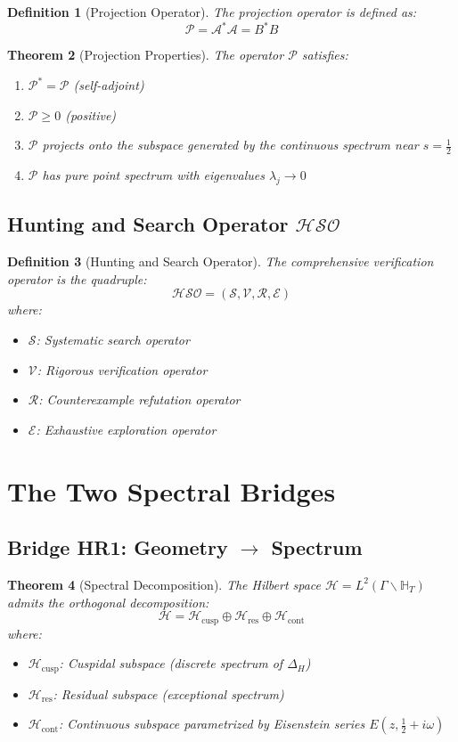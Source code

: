 \documentclass[11pt]{article}
\theoremstyle{plain}
\newtheorem{theorem}{Theorem}[section]
\newtheorem{definition}[theorem]{Definition}
\theoremstyle{remark}
\newcommand{\H}{\mathbb{H}}
\newcommand{\cH}{\mathcal{H}}
\newcommand{\cA}{\mathcal{A}}
\newcommand{\cP}{\mathcal{P}}
\newcommand{\cS}{\mathcal{S}}
\newcommand{\cV}{\mathcal{V}}
\newcommand{\cR}{\mathcal{R}}
\newcommand{\cE}{\mathcal{E}}
\newcommand{\HSO}{\mathcal{HSO}}
\newcommand{\Laplace}{\Delta}
\begin{document}
\begin{definition}[Projection Operator]
The projection operator is defined as:
\[
\cP = \cA^* \cA = B^*B
\]
\end{definition}

\begin{theorem}[Projection Properties]
The operator $\cP$ satisfies:
\begin{enumerate}
\item $\cP^* = \cP$ (self-adjoint)
\item $\cP \geq 0$ (positive)
\item $\cP$ projects onto the subspace generated by the continuous spectrum near $s = \tfrac{1}{2}$
\item $\cP$ has pure point spectrum with eigenvalues $\lambda_j \to 0$
\end{enumerate}
\end{theorem}

\subsection{Hunting and Search Operator $\HSO$}

\begin{definition}[Hunting and Search Operator]
The comprehensive verification operator is the quadruple:
\[
\HSO = (\cS, \cV, \cR, \cE)
\]
where:
\begin{itemize}
\item $\cS$: Systematic search operator
\item $\cV$: Rigorous verification operator  
\item $\cR$: Counterexample refutation operator
\item $\cE$: Exhaustive exploration operator
\end{itemize}
\end{definition}

\section{The Two Spectral Bridges}

\subsection{Bridge HR1: Geometry $\rightarrow$ Spectrum}

\begin{theorem}[Spectral Decomposition]
The Hilbert space $\cH = L^2(\Gamma \backslash \H_T)$ admits the orthogonal decomposition:
\[
\cH = \cH_{\text{cusp}} \oplus \cH_{\text{res}} \oplus \cH_{\text{cont}}
\]
where:
\begin{itemize}
\item $\cH_{\text{cusp}}$: Cuspidal subspace (discrete spectrum of $\Laplace_H$)
\item $\cH_{\text{res}}$: Residual subspace (exceptional spectrum)  
\item $\cH_{\text{cont}}$: Continuous subspace parametrized by Eisenstein series $E(z, \tfrac{1}{2} + i\omega)$
\end{itemize}
\end{theorem}
\end{document}
